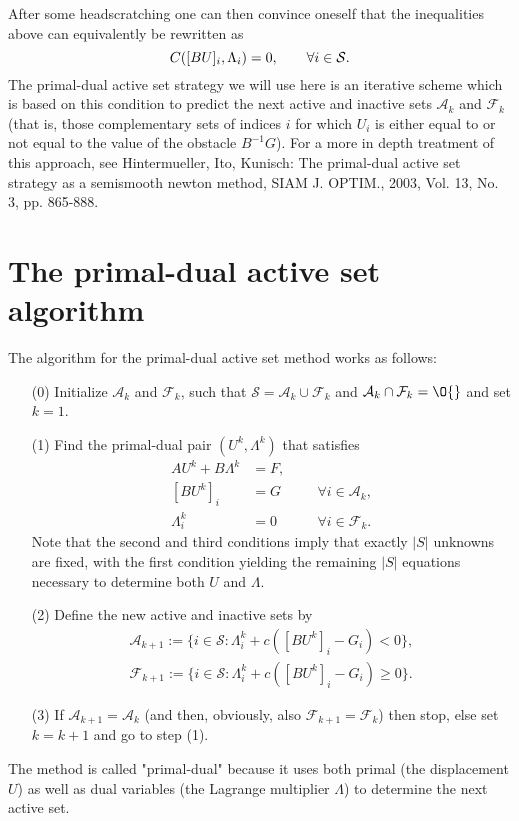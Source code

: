 \documentclass{article}
\begin{document}
After some headscratching one can then convince oneself that the inequalities
above can equivalently be rewritten as
\begin{equation*}
 C([BU]_i,\Lambda_i) = 0, \qquad \forall i\in{\cal S}.
\end{equation*}
The primal-dual active set strategy we will use here is an iterative scheme which is based on
this condition to predict the next active and inactive sets $\mathcal{A}_k$ and
$\mathcal{F}_k$ (that is, those complementary sets of indices $i$ for which
$U_i$ is either equal to or not equal to the value of the obstacle
$B^{-1}G$). For a more in depth treatment of this approach, see Hintermueller, Ito, Kunisch: The primal-dual active set
strategy as a semismooth newton method, SIAM J. OPTIM., 2003, Vol. 13, No. 3,
pp. 865-888.

\section{The primal-dual active set algorithm}

The algorithm for the primal-dual active set method works as follows:
\begin{itemize}
 \item [(0)] Initialize $\mathcal{A}_k$ and $\mathcal{F}_k$, such that $\mathcal{S}=\mathcal{A}_k\cup\mathcal{F}_k$ and $\mathcal{A}_k\cap\mathcal{F}_k=\O{}$ and set $k=1$.
 \item [(1)] Find the primal-dual pair $(U^k,\Lambda^k)$ that satisfies
 \begin{align*}
  AU^k + B\Lambda^k &= F,\\
  [BU^k]_i &= G\quad&&\forall i\in\mathcal{A}_k,\\
  \Lambda_i^k &= 0\quad&&\forall i\in\mathcal{F}_k.
 \end{align*}
 Note that the second and third conditions imply that exactly $|S|$ unknowns
 are fixed, with the first condition yielding the remaining $|S|$ equations
 necessary to determine both $U$ and $\Lambda$.
 \item [(2)] Define the new active and inactive sets by
 \begin{equation*}
 \begin{split}
  \mathcal{A}_{k+1}:=\lbrace i\in\mathcal{S}:\Lambda^k_i + c([BU^k]_i - G_i)< 0\rbrace,\\
  \mathcal{F}_{k+1}:=\lbrace i\in\mathcal{S}:\Lambda^k_i + c([BU^k]_i - G_i)\geq 0\rbrace.
 \end{split}
 \end{equation*}
 \item [(3)] If $\mathcal{A}_{k+1}=\mathcal{A}_k$ (and then, obviously, also $\mathcal{F}_{k+1}=\mathcal{F}_k$) then stop, else set $k=k+1$ and go to step (1).
\end{itemize}
The method is called "primal-dual" because it uses both primal (the
displacement $U$) as well as dual variables (the Lagrange multiplier
$\Lambda$) to determine the next active set.
\end{document}
